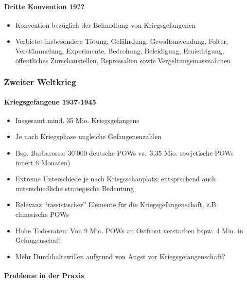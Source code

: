 {}\documentclass[a4paper]{article}
\providecommand{\tightlist}{\setlength{\itemsep}{1mm}\setlength{\parskip}{1mm}}
\begin{document}
\paragraph{Dritte Konvention 19??}\label{dritte-konvention-19}

\begin{itemize}
	\tightlist
	\item
	      Konvention bezüglich der Behandlung von Kriegsgefangenen
	\item
	      Verbietet insbesondere Tötung, Gefährdung, Gewaltanwendung, Folter,
	      Verstümmelung, Experimente, Bedrohung, Beleidigung, Erniedrigung,
	      öffentliches Zurschaustellen, Repressalien sowie Vergeltungsmassnahmen
\end{itemize}

\subsubsection{Zweiter Weltkrieg}\label{zweiter-weltkrieg}

\paragraph{Kriegsgefangene 1937-1945}\label{kriegsgefangene-1937-1945}

\begin{itemize}
	\tightlist
	\item
	      Insgesamt mind. 35 Mio. Kriegsgefangene
	\item
	      Je nach Kriegsphase ungleiche Gefangenenzahlen
	\item
	      Bsp. Barbarossa: 30'000 deutsche POWs vs.~3,35 Mio. sowjetische POWs
	      innert 6 Monaten)
	\item
	      Extreme Unterschiede je nach Kriegsschauplatz; entsprechend auch
	      unterschiedliche strategische Bedeutung
	\item
	      Relevanz ``rassistischer'' Elemente für die Kriegsgefangenschaft, z.B.
	      chinesische POWs
	\item
	      Hohe Todesraten: Von 9 Mio. POWs an Ostfront verstarben bspw. 4 Mio.
	      in Gefangenschaft
	\item
	      Mehr Durchhaltewillen aufgrund von Angst vor Kriegsgefangenschaft?
\end{itemize}

\paragraph{Probleme in der Praxis}\label{probleme-in-der-praxis-1}
\end{document}
